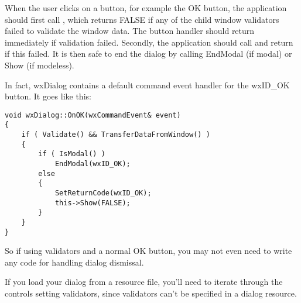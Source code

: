 
When the user clicks on a button, for example the OK button, the application should
first call , which returns FALSE if
any of the child window validators failed to validate the window data. The button handler
should return immediately if validation failed. Secondly, the application should
call  and
return if this failed. It is then safe to end the dialog by calling EndModal (if modal)
or Show (if modeless).

In fact, wxDialog contains a default command event handler for the wxID\_OK button. It goes like
this:

\begin{verbatim}
void wxDialog::OnOK(wxCommandEvent& event)
{
	if ( Validate() && TransferDataFromWindow() )
	{
        if ( IsModal() )
            EndModal(wxID_OK);
        else
        {
		    SetReturnCode(wxID_OK);
		    this->Show(FALSE);
        }
	}
}
\end{verbatim}

So if using validators and a normal OK button, you may not even need to write any
code for handling dialog dismissal.

If you load your dialog from a resource file, you'll need to iterate through the controls
setting validators, since validators can't be specified in a dialog resource.

